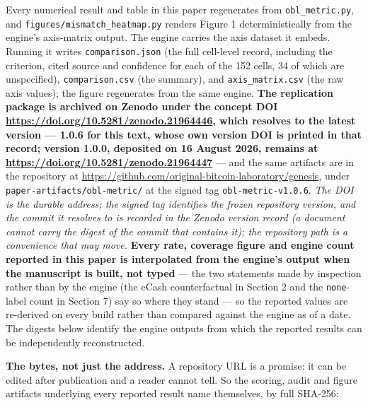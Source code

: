 \documentclass[
]{article}
\newcounter{none} %
\begin{document}
Every numerical result and table in this paper regenerates from
\texttt{obl\_metric.py}, and \texttt{figures/mismatch\_heatmap.py}
renders Figure 1 deterministically from the engine's axis-matrix output.
The engine carries the axis dataset it embeds. Running it writes
\texttt{comparison.json} (the full cell-level record, including the
criterion, cited source and confidence for each of the 152 cells, 34 of
which are unspecified), \texttt{comparison.csv} (the summary), and
\texttt{axis\_matrix.csv} (the raw axis values); the figure regenerates
from the same engine. \textbf{The replication package is archived on
Zenodo under the concept DOI
\url{https://doi.org/10.5281/zenodo.21964446}, which resolves to the
latest version --- 1.0.6 for this text, whose own version DOI is printed
in that record; version 1.0.0, deposited on 16 August 2026, remains at
\url{https://doi.org/10.5281/zenodo.21964447}} --- and the same
artifacts are in the repository at
\url{https://github.com/original-bitcoin-laboratory/genesis}, under
\texttt{paper-artifacts/obl-metric/} at the signed tag
\texttt{obl-metric-v1.0.6}. \emph{The DOI is the durable address; the
signed tag identifies the frozen repository version, and the commit it
resolves to is recorded in the Zenodo version record (a document cannot
carry the digest of the commit that contains it); the repository path is
a convenience that may move.} \textbf{Every rate, coverage figure and
engine count reported in this paper is interpolated from the engine's
output when the manuscript is built, not typed} --- the two statements
made by inspection rather than by the engine (the eCash counterfactual
in Section 2 and the \texttt{none}-label count in Section 7) say so
where they stand --- so the reported values are re-derived on every
build rather than compared against the engine as of a date. The digests
below identify the engine outputs from which the reported results can be
independently reconstructed.

\textbf{The bytes, not just the address.} A repository URL is a promise:
it can be edited after publication and a reader cannot tell. So the
scoring, audit and figure artifacts underlying every reported result
name themselves, by full SHA-256:
\end{document}
